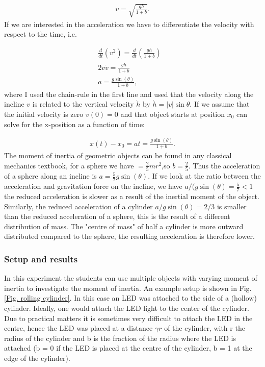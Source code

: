 \documentclass{article}
\begin{document}
\begin{align}
    v = \sqrt{\frac{gh}{1+b}}.
\end{align}
If we are interested in the acceleration we have to differentiate the velocity with respect to the time, i.e. 

\begin{align}
    \frac{d}{dt}(v^2) =\frac{d}{dt} (\frac{gh}{1+b}) &\\
    2v\dot{v} = \frac{g\dot{h}}{1+b} & \\
    a = \frac{g\sin(\theta)}{1+b},
\end{align}
where I used the chain-rule in the first line and used that the velocity along the incline $v$ is related to the vertical velocity $\dot{h}$ by $\dot{h} = |v|\sin{\theta}$. If we assume that the initial velocity is zero $v(0) = 0$ and that object starts at position $x_0$ can solve for the x-position as a function of time:

\begin{align}
    x(t) - x_0 = at = \frac{g\sin(\theta)}{1+b}.
    \label{eq: rolling cylinder}
\end{align}
The moment of inertia of geometric objects can be found in any classical mechanics textbook, for a sphere we have $=\frac{2}{5}mr^2$,so $b=\frac{2}{5}$. Thus the acceleration of a sphere along an incline is $a = \frac{5}{7}g\sin(\theta)$. If we look at the ratio between the acceleration and gravitation force on the incline, we have $a/(g\sin(\theta) = \frac{5}{7}<1$ the reduced acceleration is slower as a result of the inertial moment of the object. Similarly, the reduced acceleration of a cylinder $a / g\sin(\theta) = 2/3$ is smaller than the reduced acceleration of a sphere, this is the result of a different distribution of mass. The "centre of mass" of half a cylinder is more outward distributed compared to the sphere, the resulting acceleration is therefore lower.

\subsubsection{Setup and results}
In this experiment the students can use multiple objects with varying moment of inertia to investigate the moment of inertia. An example setup is shown in Fig. \ref{Fig. rolling cylinder}. In this case an LED was attached to the side of a (hollow) cylinder. Ideally, one would attach the LED light to the center of the cylinder. Due to practical matters it is sometimes very difficult to attach the LED in the centre, hence the LED was placed at a distance $\gamma r$ of the cylinder, with r the radius of the cylinder and b is the fraction of the radius where the LED is attached (b = 0 if the LED is placed at the centre of the cylinder, b = 1 at the edge of the cylinder). 
\end{document}
